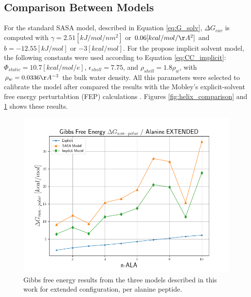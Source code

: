 \subsection{Comparison Between Models}\label{subsec:comparison}
For the standard SASA model, described in Equation \ref{eq:G_solv}, $\Delta G_{cav}$ is computed with $\gamma = 2.51 [kJ/mol/nm^2]$ or $0.06 [kcal/mol/\AA^2]$ and $b = -12.55 [kJ/mol]$ or $-3 [kcal/mol]$. For the propose implicit solvent model, the following constants were used according to Equation \ref{eq:CC_implicit}: $\Phi_{static} = 10.7 [kcal/mol/e]$, $\epsilon_{shell} = 7.75$, and $\rho_{shell}=1.8\rho_w$, with $\rho_w=0.0336 \AA^{-3}$ the bulk water density. All this parameters were selected to calibrate the model after compared the results with the Mobley's explicit-solvent free energy perturtabtion (FEP) calculations \cite{mobley2009small}. Figures \ref{fig:helix_comparison} and \ref{fig:ext_comparison} shows these results. 

\begin{figure}[h]
    \centering
    \includegraphics[scale=0.65]{Figures/Chapter_6/comparison_extended.png}
    \caption{Gibbs free energy results from the three models described in this work for extended configuration, per alanine peptide.}
    \label{fig:ext_comparison}
\end{figure}

